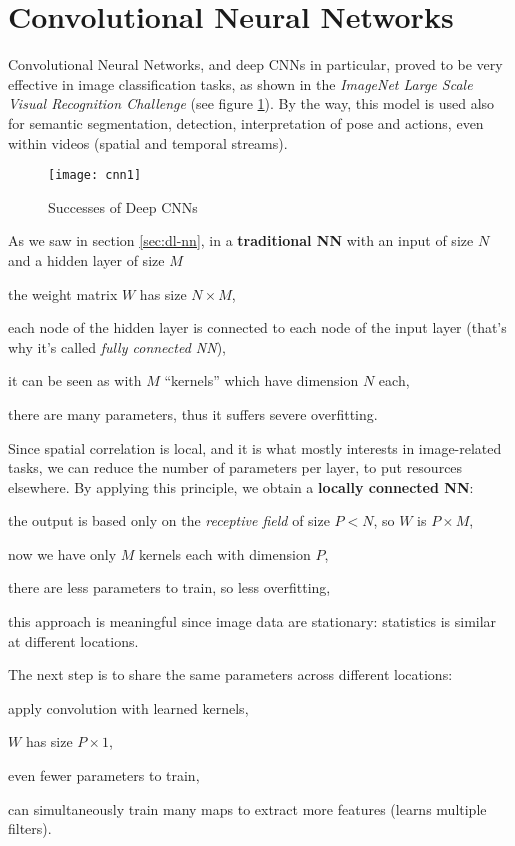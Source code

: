 \section{Convolutional Neural Networks}\label{sec:cnn}

Convolutional Neural Networks, and deep CNNs in particular, proved to be very effective in image classification tasks, as shown in the \textit{ImageNet Large Scale Visual Recognition Challenge} (see figure \ref{fig:cnn1}). By the way, this model is used also for semantic segmentation, detection, interpretation of pose and actions, even within videos (spatial and temporal streams).

\begin{figure}[h!]
    \centering
    \texttt{[image: cnn1]}
    \caption[Successes of Deep CNNs]{Successes of Deep CNNs}
    \label{fig:cnn1}
\end{figure}

As we saw in section \ref{sec:dl-nn}, in a \textbf{traditional NN} with an input of size $N$ and a hidden layer of size $M$
\begin{myitem}
    \item the weight matrix $W$ has size $N \times M$,
    \item each node of the hidden layer is connected to each node of the input layer (that's why it's called \textit{fully connected NN}),
    \item it can be seen as with $M$ ``kernels'' which have dimension $N$ each,
    \item there are many parameters, thus it suffers severe overfitting.
\end{myitem}
Since spatial correlation is local, and it is what mostly interests in image-related tasks, we can reduce the number of parameters per layer, to put resources elsewhere. By applying this principle, we obtain a \textbf{locally connected NN}:
\begin{myitem}
    \item the output is based only on the \textit{receptive field} of size $P<N$, so $W$ is $P \times M$,
    \item now we have only $M$ kernels each with dimension $P$,
    \item there are less parameters to train, so less overfitting,
    \item this approach is meaningful since image data are stationary: statistics is similar at different locations.
\end{myitem}
The next step is to share the same parameters across different locations:
\begin{myitem}
    \item apply convolution with learned kernels,
    \item $W$ has size $P \times 1$,
    \item even fewer parameters to train,
    \item can simultaneously train many maps to extract more features (learns multiple filters).
\end{myitem}

